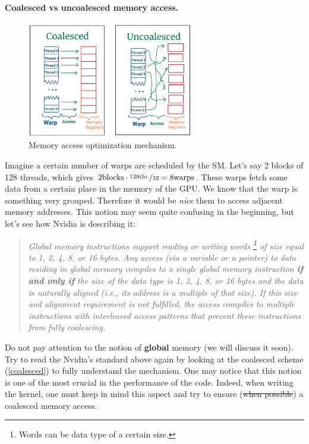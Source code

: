\paragraph{Coalesced vs uncoalesced memory access.} 

\begin{figure}
      \vspace{-10pt}
      \centering
      \includegraphics[height=5cm]{pngs/coalesced.png}
   \caption{Memory access optimization mechanism.}
   \label{coalesced}
\end{figure}

Imagine a certain number of warps are scheduled by the SM. Let's say 2 blocks of 128 threads, which gives 
$2\text{blocks}\cdot\nicefrac{128\text{thr.}}{32} = 8 \text{warps}$. These warps fetch some data 
from a certain place in the memory of the GPU. We know that the warp is something very grouped. 
Therefore it would be \textit{nice} them to access adjacent memory addresses. This notion 
may seem quite confusing in the beginning, but let's see how Nvidia is describing it\cite{center}:

\vspace{-10pt}
\begin{quote}
   \textsl{Global memory instructions support reading or writing words \footnote{Words can be data type of a certain size.} 
   of size equal to 1, 2, 4, 8, or 16 bytes. 
   Any access (via a variable or a pointer) to data residing in global memory compiles to a single global memory 
   instruction \textbf{if and only if} the size of the data type is 1, 2, 4, 8, or 16 bytes and the data is naturally aligned 
   (i.e., its address is a multiple of that size). If this size and alignment requirement is not fulfilled, the access 
   compiles to multiple instructions with interleaved access patterns that prevent these instructions from fully coalescing.}
\label{coalescedquote}
\end{quote}
Do not pay attention to the notion of \textbf{global} memory (we will discuss it soon).
Try to read the Nvidia's standard above again by looking at the coalesced scheme (\autoref{coalesced})
to fully understand the mechanism. One may notice that this notion is one of the most crucial in the performance of the code.
Indeed, when writing the kernel, one must keep in mind this aspect and try to ensure (\sout{when possible}) 
a coalesced memory access.

